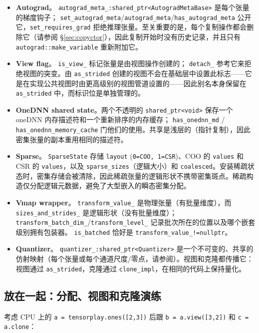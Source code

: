 \begin{itemize}[leftmargin=1.2em]
\item \textbf{Autograd}。 \texttt{autograd\_meta\_:shared\_ptr<AutogradMetaBase>} 是每个张量的梯度钩子； \texttt{set\_autograd\_meta}/\texttt{autograd\_meta}/\texttt{has\_autograd\_meta} 公开它，\texttt{set\_requires\_grad} 拒绝推理张量。至关重要的是，每个复制操作都会删除它（请参阅 \S\ref{sec:copyctor}），因此复制开始时没有历史记录，并且只有 \texttt{autograd::make\_variable} 重新附加它。
\item \textbf{View flag}。 \texttt{is\_view\_} 标记张量是由视图操作创建的； \texttt{detach\_} 参考它来拒绝视图的突变。由 \texttt{as\_strided} 创建的视图不会在基础层中设置此标志——它是在实现公共视图时由更高级别的视图管道设置的——因此别名本身保留在 \texttt{as\_strided} 中，而标识位是单独管理的。
\item \textbf{OneDNN shared state}。两个不透明的 \texttt{shared\_ptr<void>} 保存一个 oneDNN 内存描述符和一个重新排序的内存缓存； \texttt{has\_onednn\_md} / \texttt{has\_onednn\_memory\_cache} 门他们的使用。共享是浅层的（指针复制），因此密集张量的副本重用相同的描述符。
\item \textbf{Sparse}。 \texttt{SparseState} 存储 \texttt{layout} (\texttt{0=COO, 1=CSR})、COO 的 \texttt{values} 和 CSR 的 \texttt{values}，以及 \texttt{sparse\_sizes}（逻辑大小）和 \texttt{coalesced}。安装稀疏状态时，密集存储会被清除，因此稀疏张量的逻辑形状不携带密集斑点。稀疏构造仅分配逻辑元数据，避免了大型嵌入的瞬态密集分配。
\item \textbf{Vmap wrapper}。 \texttt{transform\_value\_} 是物理张量（有批量维度），而 \texttt{sizes\_and\_strides\_} 是逻辑形状（没有批量维度）； \texttt{transform\_batch\_dim\_}/\texttt{transform\_level\_} 记录批次所在的位置以及哪个嵌套级别拥有包装器。 \texttt{is\_batched} 恰好是 \texttt{transform\_value\_!=nullptr}。
\item \textbf{Quantizer}。 \texttt{quantizer\_:shared\_ptr<Quantizer>} 是一个不可变的、共享的仿射映射（每个张量或每个通道尺度/零点，请参阅）。视图和克隆都传播它：视图通过 \texttt{as\_strided}，克隆通过 \texttt{clone\_impl}，在相同的代码上保持量化。
\end{itemize}

\subsection{放在一起：分配、视图和克隆演练}
\label{sec:walktogether}

考虑 CPU 上的 \texttt{a = tensorplay.ones([2,3])} 后跟 \texttt{b = a.view([3,2])} 和 \texttt{c = a.clone}：

